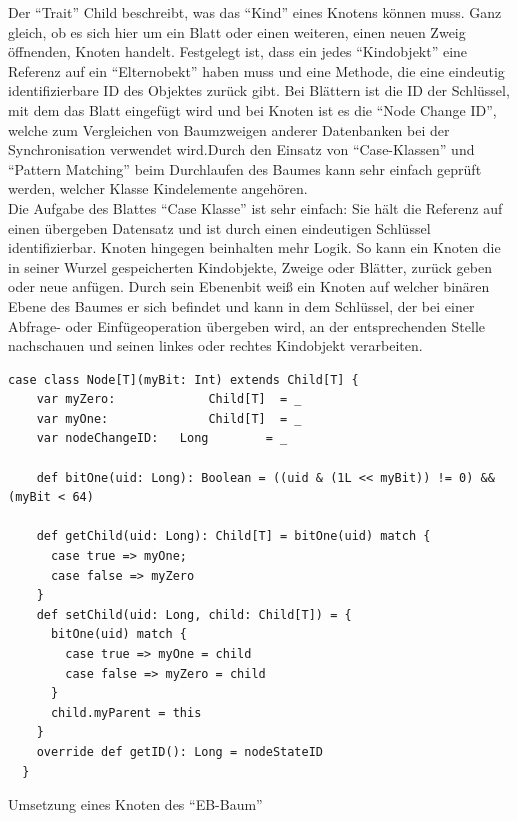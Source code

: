 \documentclass[a4paper,11pt,oneside,%
headsepline,												%
footsepline,												%
bibtotocnumbered									%
]{scrreprt}
\begin{document}
Der \enquote{Trait} Child beschreibt, was das \enquote{Kind} eines Knotens können muss. Ganz gleich, ob es sich hier um ein Blatt oder einen weiteren, einen neuen Zweig öffnenden, Knoten handelt. Festgelegt ist, dass ein jedes \enquote{Kindobjekt} eine Referenz auf ein \enquote{Elternobekt} haben muss und eine Methode, die eine eindeutig identifizierbare ID des Objektes zurück gibt. Bei Blättern ist die ID der Schlüssel, mit dem das Blatt eingefügt wird und bei Knoten ist es die \enquote{Node Change ID}, welche zum Vergleichen von Baumzweigen anderer Datenbanken bei der Synchronisation verwendet wird.Durch den Einsatz von \enquote{Case-Klassen} und \enquote{Pattern Matching} beim Durchlaufen des Baumes kann sehr einfach geprüft werden, welcher Klasse Kindelemente angehören. \\

Die Aufgabe des Blattes \enquote{Case Klasse} ist sehr einfach: Sie hält die Referenz auf einen übergeben Datensatz und ist durch einen eindeutigen Schlüssel identifizierbar. Knoten hingegen beinhalten mehr Logik.  So kann ein Knoten die in seiner Wurzel gespeicherten Kindobjekte, Zweige oder Blätter, zurück geben oder neue anfügen. Durch sein Ebenenbit weiß ein Knoten auf welcher binären Ebene des Baumes er sich befindet und kann in dem Schlüssel, der bei einer Abfrage- oder Einfügeoperation übergeben wird, an der entsprechenden Stelle nachschauen und seinen linkes oder rechtes Kindobjekt verarbeiten.

\begin{listing}[H]
	\begin{verbatim}
case class Node[T](myBit: Int) extends Child[T] {
    var myZero:				Child[T]  = _
    var myOne:				Child[T]  = _
    var nodeChangeID:	Long    	= _

    def bitOne(uid: Long): Boolean = ((uid & (1L << myBit)) != 0) && (myBit < 64)

    def getChild(uid: Long): Child[T] = bitOne(uid) match {
      case true => myOne;
      case false => myZero
    }
    def setChild(uid: Long, child: Child[T]) = {
      bitOne(uid) match {
        case true => myOne = child
        case false => myZero = child
      }
      child.myParent = this
    }
    override def getID(): Long = nodeStateID
  }	
	\end{verbatim}
	\caption{Umsetzung eines Knoten des \enquote{EB-Baum}}
	\label{lst:Knoten EB-Baum}
\end{listing}
\end{document}
